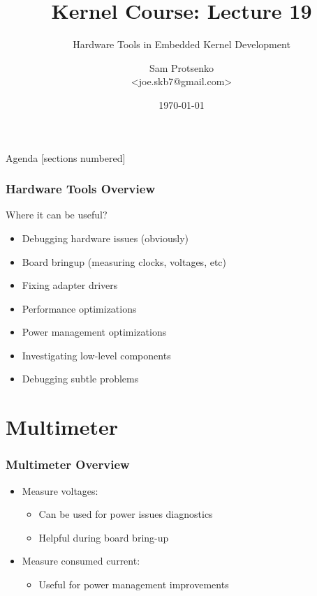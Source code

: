 

\title{Kernel Course: Lecture 19}
\subtitle{Hardware Tools in Embedded Kernel Development}
\author{Sam Protsenko \texorpdfstring{\\ <joe.skb7@gmail.com>}{}}
\date{\vspace*{5mm}\today}




\maketitle

\begin{frame}{Agenda}
  [sections numbered]
  \tableofcontents[hideallsubsections]
\end{frame}


\begin{frame}
  \frametitle{Hardware Tools Overview}
  Where it can be useful?
  \begin{itemize}
    \item Debugging hardware issues (obviously)
    \item Board bringup (measuring clocks, voltages, etc)
    \item Fixing adapter drivers
    \item Performance optimizations
    \item Power management optimizations
    \item Investigating low-level components
    \item Debugging subtle problems
  \end{itemize}
\end{frame}

\section{Multimeter}

\begin{frame}
  \frametitle{Multimeter Overview}
  \begin{itemize}
    \item Measure voltages:
      \begin{itemize}
        \item Can be used for power issues diagnostics
        \item Helpful during board bring-up
      \end{itemize}
    \item Measure consumed current:
      \begin{itemize}
        \item Useful for power management improvements
      \end{itemize}
  \end{itemize}
\end{frame}

